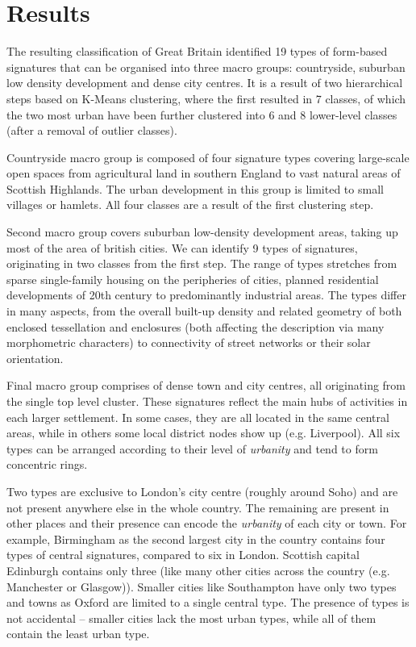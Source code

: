 \section{Results}
\label{sec:res}

The resulting classification of Great Britain identified 19 types of form-based
signatures that can be organised into three macro groups: countryside, suburban low
density development and dense city centres. It is a result of two hierarchical steps
based on K-Means clustering, where the first resulted in 7 classes, of which the two
most urban have been further clustered into 6 and 8 lower-level classes (after a removal
of outlier classes).

Countryside macro group is composed of four signature types covering large-scale open
spaces from agricultural land in southern England to vast natural areas of Scottish
Highlands. The urban development in this group is limited to small villages or hamlets.
All four classes are a result of the first clustering step.

Second macro group covers suburban low-density development areas, taking up most of the
area of british cities. We can identify 9 types of signatures, originating in two
classes from the first step. The range of types stretches from sparse single-family
housing on the peripheries of cities, planned residential developments of 20th century
to predominantly industrial areas. The types differ in many aspects, from the overall
built-up density and related geometry of both enclosed tessellation and enclosures
(both affecting the description via many morphometric characters) to connectivity of
street networks or their solar orientation.

Final macro group comprises of dense town and city centres, all originating from the
single top level cluster. These signatures reflect the main hubs of activities in each
larger settlement. In some cases, they are all located in the same central areas, while
in others some local district nodes show up (e.g. Liverpool). All six types can be
arranged according to their level of \textit{urbanity} and tend to form concentric
rings.

Two types are exclusive to
London's city centre (roughly around Soho) and are not present anywhere else in the
whole country. The remaining are present in other places and their presence can encode
the \textit{urbanity} of each city or town. For example, Birmingham as the second
largest city in the country contains four types of central signatures, compared to six
in London. Scottish capital Edinburgh contains only three (like many other cities across
the country (e.g. Manchester or Glasgow)). Smaller cities like Southampton have only two
types and towns as Oxford are limited to a single central type. The presence of types is
not accidental -- smaller cities lack the most urban types, while all of them contain the
least urban type.

